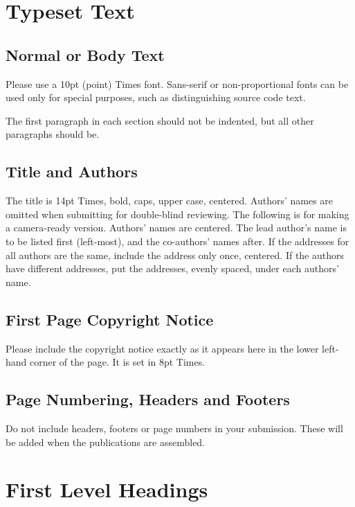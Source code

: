 \documentclass{article}
\begin{document}
\section{Typeset Text}\label{sec:typeset_text}

\subsection{Normal or Body Text}\label{subsec:body}

Please use a 10pt (point) Times font. Sans-serif or non-proportional fonts
can be used only for special purposes, such as distinguishing source code text.

The first paragraph in each section should not be indented, but all other paragraphs should be.

\subsection{Title and Authors}

The title is 14pt Times, bold, caps, upper case, centered.
Authors' names are omitted when submitting for double-blind reviewing.
The following is for making a camera-ready version.
Authors' names are centered.
The lead author's name is to be listed first (left-most), and the co-authors' names after.
If the addresses for all authors are the same, include the address only once, centered.
If the authors have different addresses, put the addresses, evenly spaced, under each authors' name.

\subsection{First Page Copyright Notice}

Please include the copyright notice exactly as it appears here in the lower left-hand corner of the page.
It is set in 8pt Times.

\subsection{Page Numbering, Headers and Footers}

Do not include headers, footers or page numbers in your submission.
These will be added when the publications are assembled.

\section{First Level Headings}
\end{document}
